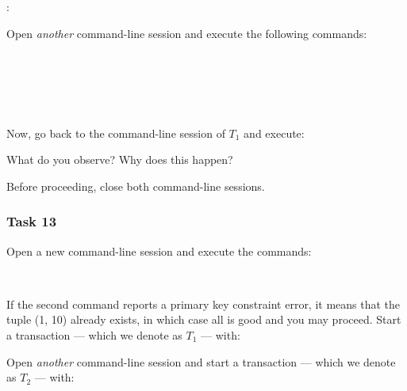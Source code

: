 \vgap

\noindent {}:

\vgap

\noindent {}

\vgap

\noindent Open {\em another} command-line session and execute the following commands:

\vgap

\noindent {}  \\
\noindent {} \\
\noindent {}  \\
\noindent {} \\
\noindent {}

\vgap

\noindent Now, go back to the command-line session of $T_1$ and execute:

\vgap

\noindent {}

\vgap

\noindent What do you observe? Why does this happen?

\vgap

\noindent Before proceeding, close both command-line sessions.


\subsubsection{Task 13}

Open a new command-line session and execute the commands:

\vgap

\noindent {} \\
\noindent {}

\vgap

\noindent If the second command reports a primary key constraint error, it means that the tuple (1, 10) already exists, in which case all is good and you may proceed. Start a transaction --- which we denote as $T_1$ --- with:

\vgap

\noindent {}

\vgap

\noindent Open {\em another} command-line session and start a transaction --- which we denote as $T_2$ --- with:

